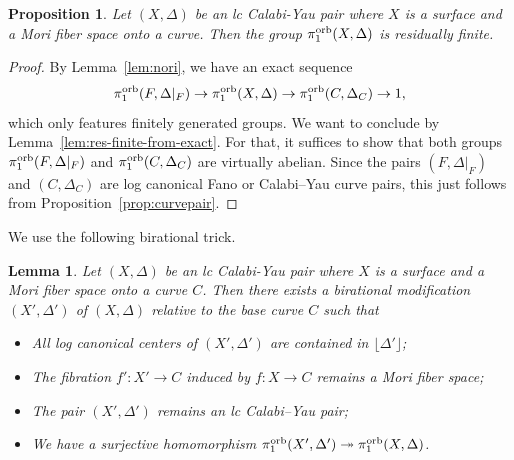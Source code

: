 \documentclass{amsart}
\newtheorem{lemma}[theorem]{Lemma}
\newtheorem{proposition}[theorem]{Proposition}
\theoremstyle{definition}
\theoremstyle{remark}
\numberwithin{equation}{section}
\begin{document}
\begin{proposition}\label{prop:res-finite-mfs}
Let $(X,\Delta)$ be an lc Calabi-Yau pair where $X$ is a surface and a Mori fiber space onto a curve. Then the group $\pi_1^{\rm orb}(X,\Delta)$ is residually finite.
\end{proposition}

\begin{proof}
By Lemma~\ref{lem:nori}, 
we have an exact sequence
$$\pi_1^{\rm orb}(F,\Delta|_F) \rightarrow 
\pi_1^{\rm orb}(X,\Delta) \rightarrow 
\pi_1^{\rm orb}(C,\Delta_C)\rightarrow 1,$$
which only features finitely generated groups.
We want to conclude by Lemma~\ref{lem:res-finite-from-exact}. For that, it suffices to show that both groups $\pi_1^{\rm orb}(F,\Delta|_F)$ and $\pi_1^{\rm orb}(C,\Delta_C)$ are virtually abelian. Since the pairs $(F,\Delta|_F)$ and $(C,\Delta_C)$ are log canonical Fano or Calabi--Yau curve pairs, this just follows from Proposition~\ref{prop:curvepair}.
\end{proof}

We use the following birational trick.

\begin{lemma}\label{lem:sarkisovlink}
Let $(X,\Delta)$ be an lc Calabi-Yau pair where $X$ is a surface and a Mori fiber space onto a curve $C$. Then there exists a birational modification $(X',\Delta')$ of $(X,\Delta)$ relative to the base curve $C$ such that
\begin{itemize}
    \item All log canonical centers of $(X',\Delta')$ are contained in $\lfloor\Delta'\rfloor$;
    \item The fibration $f':X'\to C$ induced by $f:X\to C$ remains a Mori fiber space;
    \item The pair $(X',\Delta')$ remains an lc Calabi--Yau pair;
    \item We have a surjective homomorphism $\pi_1^{\rm orb}(X',\Delta')\twoheadrightarrow\pi_1^{\rm orb}(X,\Delta)$.
\end{itemize}
\end{lemma}
\end{document}

